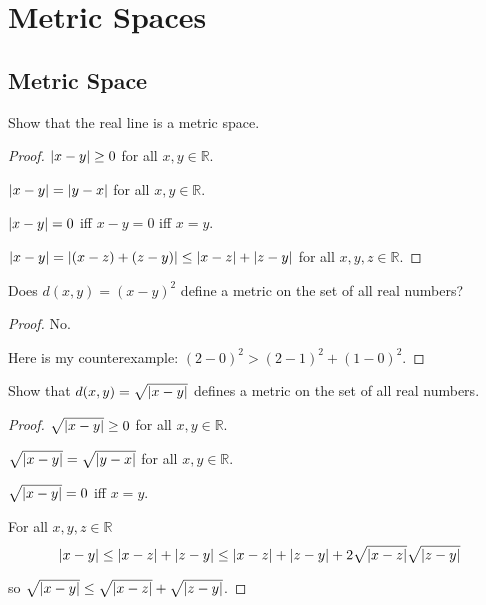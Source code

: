 \chapter{Metric Spaces}

\section{Metric Space}

\begin{exercise}\label{chapter1:section1:exercise1}
    Show that the real line is a metric space.
\end{exercise}

\begin{proof}
    $\left\vert{x - y}\right\vert\geq 0$ for all $x, y\in\mathbb{R}$.

    $\left\vert{x - y}\right\vert = \left\vert{y - x}\right\vert$ for all $x, y\in\mathbb{R}$.

    $\left\vert{x - y}\right\vert = 0$ iff $x - y = 0$ iff $x = y$.

    $\left\vert{x - y}\right\vert = \left\vert{(x - z) + (z - y)}\right\vert\leq \left\vert{x-z}\right\vert + \left\vert{z-y}\right\vert$ for all $x, y, z\in\mathbb{R}$.
\end{proof}

\begin{exercise}\label{chapter1:section1:exercise2}
    Does $d(x, y) = {(x - y)}^{2}$ define a metric on the set of all real numbers?
\end{exercise}

\begin{proof}
    No.

    Here is my counterexample: ${(2 - 0)}^{2} > {(2 - 1)}^{2} + {(1 - 0)}^{2}$.
\end{proof}

\begin{exercise}\label{chapter1:section1:exercise3}
    Show that $d(x, y) = \sqrt{\left\vert{x - y}\right\vert}$ defines a metric on the set of all real numbers.
\end{exercise}

\begin{proof}
    $\sqrt{\left\vert{x - y}\right\vert}\geq 0$ for all $x, y\in\mathbb{R}$.

    $\sqrt{\left\vert{x - y}\right\vert} = \sqrt{\left\vert{y - x}\right\vert}$ for all $x, y\in\mathbb{R}$.

    $\sqrt{\left\vert{x - y}\right\vert} = 0$ iff $x = y$.

    For all $x, y, z\in\mathbb{R}$
    \[
        \left\vert{x - y}\right\vert\leq \left\vert{x - z}\right\vert + \left\vert{z - y}\right\vert \leq \left\vert{x - z}\right\vert + \left\vert{z - y}\right\vert + 2\sqrt{\left\vert{x - z}\right\vert}\sqrt{\left\vert{z - y}\right\vert}
    \]

    so $\sqrt{\left\vert{x - y}\right\vert}\leq \sqrt{\left\vert{x - z}\right\vert} + \sqrt{\left\vert{z - y}\right\vert}$.
\end{proof}


